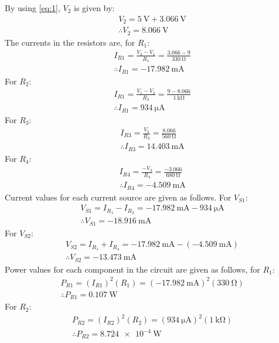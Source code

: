 \documentclass[letterpaper]{article}
\begin{document}
By using \eqref{eq:1}, $V_2$ is given by:
\begin{gather*}
    V_2=\SI{5}{\volt}+\SI{3.066}{\volt}\\
    \therefore V_2 = \SI{8.066}{\volt}
\end{gather*}
The currents in the resistors are, for $R_1$:
\begin{gather*}
    I_{R1}=\frac{V_3-V_1}{R_1}=\frac{3.066-9}{\SI{330}{\ohm}}\\
    \therefore I_{R1}=\SI{-17.982}{\milli\ampere}
\end{gather*}
For $R_2$:
\begin{gather*}
    I_{R1}=\frac{V_1-V_2}{R_2}=\frac{9-8.066}{\SI{1}{\kilo\ohm}}\\
    \therefore I_{R1}=\SI{934}{\micro\ampere}
\end{gather*}
For $R_3$:
\begin{gather*}
    I_{R3}=\frac{V_2}{R_3}=\frac{8.066}{\SI{560}{\ohm}}\\
    \therefore I_{R3}=\SI{14.403}{\milli\ampere}
\end{gather*}
For $R_4$:
\begin{gather*}
    I_{R4}=\frac{-V_3}{R_4}=\frac{-3.066}{\SI{680}{\ohm}}\\
    \therefore I_{R4}=\SI{-4.509}{\milli\ampere}
\end{gather*}
Current values for each current source are given as follows. For $V_{S1}$:
\begin{gather*}
    V_{S1} = I_{R_1}-I_{R_2} =
    \SI{-17.982}{\milli\ampere}-\SI{934}{\micro\ampere}\\
    \therefore V_{S1} = \SI{-18.916}{\milli\ampere}
\end{gather*}
For $V_{S2}$:
\begin{gather*}
    V_{S2} = I_{R_1}+I_{R_4} =
    \SI{-17.982}{\milli\ampere}-(\SI{-4.509}{\milli\ampere})\\
    \therefore V_{S2} = \SI{-13.473}{\milli\ampere}
\end{gather*}
Power values for each component in the circuit are given as follows, for $R_1$:
\begin{gather*}
    P_{R1}=(I_{R1})^2(R_1)=(\SI{-17.982}{\milli\ampere})^2(\SI{330}{\ohm})\\
    \therefore P_{R1}=\SI{0.107}{\watt}
\end{gather*}
For $R_2$:
\begin{gather*}
    P_{R2}=(I_{R2})^2(R_2)=(\SI{934}{\micro\ampere})^2(\SI{1}{\kilo\ohm})\\
    \therefore P_{R2}=\SI{8.724e-4}{\watt}
\end{gather*}
\end{document}
